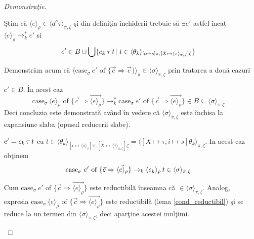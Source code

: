 \begin{proof}[Demonstra\c tie]
\begin{description}
  \c Stim c\u a $\langle e \rangle_{\rho} \in \langle d^{\hat{s}}\tau \rangle_{\pi,\zeta}$ \c si din defini\c tia \^ inchiderii trebuie s\u a $\exists e'$ astfel \^ incat $\langle e \rangle_{\rho}\to_k^* e'$ si
  \begin{equation}
  e' \in B \cup \bigcup \{c_k \hspace{2pt} \tau\hspace{2pt} t \: | \: t \in \langle \theta_k \rangle_{[ \iota \mapsto s]\pi,[X \mapsto \langle \tau \rangle_{\pi, \zeta } ] \zeta}\}
  \end{equation}

  Demonstr\u am acum c\u a $\langle \text{case}_{\sigma}\ e' \text{ of } \{ \vec{c} \Rightarrow \vec{e} \} \rangle_{\rho} \in \langle \sigma \rangle_{\pi,\zeta}$ prin tratarea a dou\u a cazuri
  \begin{enumerate*}
    \item $ e' \in B$. \^ In acest caz
        \begin{equation}
            \text{case}_{\sigma}\ \langle e \rangle_{\rho}\text{ of } \{ \vec{c} \Rightarrow \vec{\langle e\rangle_{\rho}} \} \to_k^*
            \text{case}_{\sigma}\  e' \text{ of } \{ \vec{c} \Rightarrow \vec{\langle e\rangle_{\rho}} \}
            \in B \subseteq \langle \sigma \rangle_{\pi,\zeta}
         \end{equation}
         Deci concluzia este demonstrat\u a av\^ and \^ in vedere c\u a $\langle \sigma \rangle_{\pi,\zeta} $ este \^ inchisa la expansiune slaba (opusul reducerii slabe).
    \item $ e' = c_k \hspace{2pt} \tau \hspace{2pt} t $ cu $t \in \langle \theta_k \rangle_{[ \iota \mapsto \langle s \rangle_{\pi}]\pi,[X \mapsto \langle \tau \rangle_{\pi, \zeta } ] \zeta} = \langle [X\mapsto \tau, i\mapsto s] \theta_k \rangle_{\pi,\zeta}$. In acest caz ob\c tinem
        \begin{equation}
            \text{case}_{\sigma}\ e' \text{ of } \{ \vec{c} \Rightarrow \vec{\langle e\rangle_{\rho}} \} \to_k
            \langle e_k  \rangle_{\rho}\app t \in  \langle \sigma \rangle_{\pi,\zeta}
        \end{equation}

        Cum $\text{case}_{\sigma}\ e' \text{ of } \{ \vec{c} \Rightarrow \vec{\langle e\rangle_{\rho}} \}$ este reductibil\u a \^ inseamna c\u a $\in  \langle \sigma \rangle_{\pi,\zeta}$. Analog, expresia $\text{case}_{\sigma}\ \langle e \rangle_{\rho} \text{ of } \{ \vec{c} \Rightarrow \vec{\langle e\rangle_{\rho}} \}$ este reductibil\u a (lema \ref{cond_reductibil}) \c si se reduce la un termen din $\langle \sigma \rangle_{\pi,\zeta}$, deci apar\c tine acestei mul\c timi.
  \end{enumerate*}


\end{description}
\end{proof}
